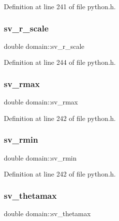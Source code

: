 Definition at line 241 of file python.\+h.

\mbox{\label{structdomain_a7467c5be7712498d0a673c485074e918}} 
\subsubsection{\texorpdfstring{sv\+\_\+r\+\_\+scale}{sv\_r\_scale}}
{\footnotesize\ttfamily double domain\+::sv\+\_\+r\+\_\+scale}



Definition at line 244 of file python.\+h.

\mbox{\label{structdomain_af5497596d6f246fae7c5c15458b2a03d}} 
\subsubsection{\texorpdfstring{sv\+\_\+rmax}{sv\_rmax}}
{\footnotesize\ttfamily double domain\+::sv\+\_\+rmax}



Definition at line 242 of file python.\+h.

\mbox{\label{structdomain_a4e786a4656d477a90d054c260ab3302d}} 
\subsubsection{\texorpdfstring{sv\+\_\+rmin}{sv\_rmin}}
{\footnotesize\ttfamily double domain\+::sv\+\_\+rmin}



Definition at line 242 of file python.\+h.

\mbox{\label{structdomain_a20e1097ea83aafde4917c3ec41c800b0}} 
\subsubsection{\texorpdfstring{sv\+\_\+thetamax}{sv\_thetamax}}
{\footnotesize\ttfamily double domain\+::sv\+\_\+thetamax}



